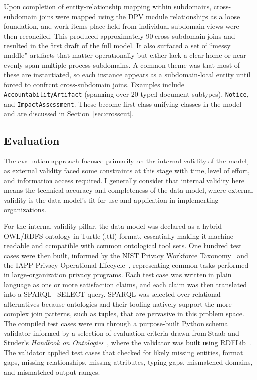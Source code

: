 \documentclass[10pt,letterpaper,twocolumn,twoside]{rho-class/rho}
\begin{document}
Upon completion of entity-relationship mapping within subdomains, cross-subdomain joins were mapped using the DPV module relationships as a loose foundation, and work items place-held from individual subdomain views were then reconciled. This produced approximately 90 cross-subdomain joins and resulted in the first draft of the full model. It also surfaced a set of ``messy middle'' artifacts that matter operationally but either lack a clear home or near-evenly span multiple process subdomains. A common theme was that most of these are instantiated, so each instance appears as a subdomain-local entity until forced to confront cross-subdomain joins. Examples include \texttt{AccountabilityArtifact} (spanning over 20 typed document subtypes), \texttt{Notice}, and \texttt{ImpactAssessment}. These become first-class unifying classes in the model and are discussed in Section~\ref{sec:crosscut}.

\subsection{Evaluation}\label{sec:eval}

The evaluation approach focused primarily on the internal validity of the model, as external validity faced some constraints at this stage with time, level of effort, and information access required. I generally consider that internal validity here means the technical accuracy and completeness of the data model, where external validity is the data model's fit for use and application in implementing organizations.

For the internal validity pillar, the data model was declared as a hybrid OWL/RDFS ontology in Turtle (.ttl) format, essentially making it machine-readable and compatible with common ontological tool sets. One hundred test cases were then built, informed by the NIST Privacy Workforce Taxonomy~\cite{nist-pwt-2024} and the IAPP Privacy Operational Lifecycle~\cite{iapp-ppm-2022}, representing common tasks performed in large-organization privacy programs. Each test case was written in plain language as one or more satisfaction claims, and each claim was then translated into a SPARQL~\cite{sparql11query} SELECT query. SPARQL was selected over relational alternatives because ontologies and their tooling natively support the more complex join patterns, such as tuples, that are pervasive in this problem space. The compiled test cases were run through a purpose-built Python schema
validator informed by a selection of evaluation criteria drawn from Staab and Studer's \emph{Handbook on Ontologies}~\cite{staab2009handbook}, where the validator was built using RDFLib~\cite{rdflib}. The validator applied test cases that checked for likely missing entities, format gaps, missing relationships, missing attributes, typing gaps, mismatched domains, and mismatched output ranges.
\end{document}
